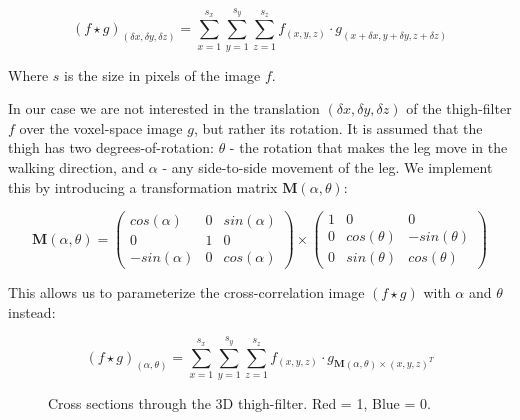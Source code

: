 \begin{equation}
	(f \star g)_{(\delta x,\delta y,\delta z)} = \sum_{x=1}^{s_{x}} \sum_{y=1}^{s_{y}} \sum_{z=1}^{s_{z}} f_{(x,y,z)} \cdot g_{(x+\delta x,y+\delta y, z+\delta z)}
\end{equation}

Where $s$ is the size in pixels of the image $f$.

In our case we are not interested in the translation $(\delta x,\delta y,\delta z)$ of the thigh-filter $f$ over the voxel-space image $g$, but rather its rotation.
It is assumed that the thigh has two degrees-of-rotation: $\theta$ - the rotation that makes the leg move in the walking direction, and $\alpha$ - any side-to-side movement of the leg.
We implement this by introducing a transformation matrix $\mathbf{M}(\alpha,\theta)$:

\begin{equation}
	\mathbf{M}(\alpha,\theta) =
	\left(\begin{array}{ccc}
		cos(\alpha) & 0 & sin(\alpha) \\
		0 & 1 & 0 \\
		-sin(\alpha) & 0 & cos(\alpha)
	\end{array} \right)
	\times
	\left(\begin{array}{ccc}
		1 & 0 & 0 \\
		0 & cos(\theta) & -sin(\theta) \\
		0 & sin(\theta) & cos(\theta)
	\end{array} \right)
	\label{eqn:Matrix}
\end{equation}

This allows us to parameterize the cross-correlation image $(f \star g)$ with $\alpha$ and $\theta$ instead:

\begin{equation}
	(f \star g)_{(\alpha,\theta)} = \sum_{x=1}^{s_{x}} \sum_{y=1}^{s_{y}} \sum_{z=1}^{s_{z}} f_{(x,y,z)} \cdot g_{\mathbf{M}(\alpha,\theta) \times (x,y,z)^T}
	\label{eqn:CrossCorrelation}
\end{equation}


\begin{figure}[tb]
	\centering
	\quad
	\caption{Cross sections through the 3D thigh-filter.  Red = 1, Blue = 0.}
	\label{ThighFilterCrossSections}
\end{figure}

